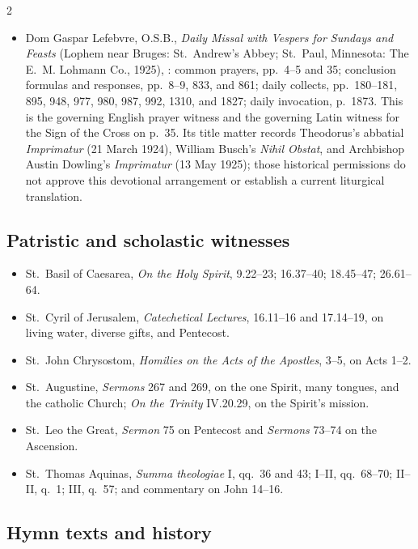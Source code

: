 \begin{multicols}{2}
\begin{itemize}
\item Dom Gaspar Lefebvre, O.S.B., \textit{Daily Missal with Vespers for Sundays and Feasts} (Lophem near Bruges: St.~Andrew's Abbey; St.~Paul, Minnesota: The E.~M. Lohmann Co., 1925), : common prayers, pp.~4--5 and 35; conclusion formulas and responses, pp.~8--9, 833, and 861; daily collects, pp.~180--181, 895, 948, 977, 980, 987, 992, 1310, and 1827; daily invocation, p.~1873. This is the governing English prayer witness and the governing Latin witness for the Sign of the Cross on p.~35. Its title matter records Theodorus's abbatial \textit{Imprimatur} (21 March 1924), William Busch's \textit{Nihil Obstat}, and Archbishop Austin Dowling's \textit{Imprimatur} (13 May 1925); those historical permissions do not approve this devotional arrangement or establish a current liturgical translation.
\end{itemize}

\subsection{Patristic and scholastic witnesses}

\begin{itemize}
\item St.~Basil of Caesarea, \textit{On the Holy Spirit}, 9.22--23; 16.37--40; 18.45--47; 26.61--64.
\item St.~Cyril of Jerusalem, \textit{Catechetical Lectures}, 16.11--16 and 17.14--19, on living water, diverse gifts, and Pentecost.
\item St.~John Chrysostom, \textit{Homilies on the Acts of the Apostles}, 3--5, on Acts 1--2.
\item St.~Augustine, \textit{Sermons} 267 and 269, on the one Spirit, many tongues, and the catholic Church; \textit{On the Trinity} IV.20.29, on the Spirit's mission.
\item St.~Leo the Great, \textit{Sermon} 75 on Pentecost and \textit{Sermons} 73--74 on the Ascension.
\item St.~Thomas Aquinas, \textit{Summa theologiae} I, qq.~36 and 43; I--II, qq.~68--70; II--II, q.~1; III, q.~57; and commentary on John 14--16.
\end{itemize}

\subsection{Hymn texts and history}


\end{multicols}
